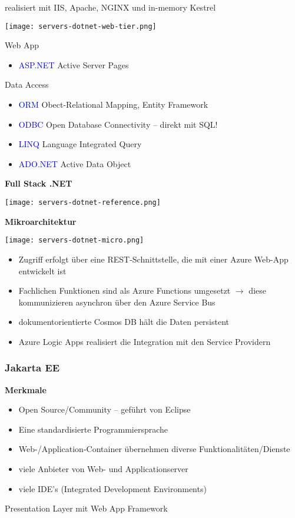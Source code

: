realisiert mit IIS, Apache, NGINX und in-memory Kestrel

\texttt{[image: servers-dotnet-web-tier.png]}

Web App

\begin{itemize}
    \item \textcolor{blue}{ASP.NET} Active Server Pages
\end{itemize}
\vspace{10pt}
Data Access

\begin{itemize}
    \item \textcolor{blue}{ORM} Obect-Relational Mapping, Entity Framework
    \item \textcolor{blue}{ODBC} Open Database Connectivity – direkt mit SQL!
    \item \textcolor{blue}{LINQ} Language Integrated Query
    \item \textcolor{blue}{ADO.NET} Active Data Object
\end{itemize}
\vspace{10pt}
\columnbreak
\textbf{Full Stack .NET}

\texttt{[image: servers-dotnet-reference.png]}

\textbf{Mikroarchitektur}

\texttt{[image: servers-dotnet-micro.png]}

\begin{itemize}
    \item Zugriff erfolgt über eine REST-Schnittstelle, die mit einer Azure Web-App entwickelt ist
    \item Fachlichen Funktionen sind als Azure Functions umgesetzt $\rightarrow$ diese kommunizieren asynchron über den Azure Service Bus
    \item dokumentorientierte Cosmos DB hält die Daten persistent
    \item Azure Logic Apps realisiert die Integration mit den Service Providern
\end{itemize}

\columnbreak
\subsubsection{Jakarta EE}

\textbf{Merkmale}

\begin{itemize}
    \item Open Source/Community – geführt von Eclipse
    \item Eine standardisierte Programmiersprache
    \item Web-/Application-Container übernehmen diverse Funktionalitäten/Dienste
    \item viele Anbieter von Web- und Applicationserver
    \item viele IDE's (Integrated Development Environments)
\end{itemize}
\vspace{10pt}
Presentation Layer mit Web App Framework

